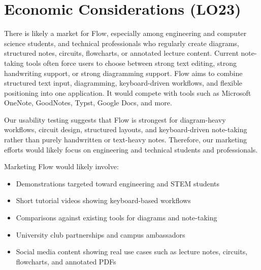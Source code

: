 \documentclass{article}
\begin{document}
\section{Economic Considerations (LO23)}


There is likely a market for Flow, especially among engineering  and computer 
science students, and technical professionals who regularly create diagrams, 
structured notes, circuits, flowcharts, or annotated lecture content. Current 
note-taking tools often force users to choose between strong text editing, 
strong handwriting support, or strong diagramming support. Flow aims to combine 
structured text input, diagramming, keyboard-driven workflows, and flexible 
positioning into one application. It would compete with tools such as Microsoft 
OneNote, GoodNotes, Typst, Google Docs, and more. 

Our usability testing suggests that Flow is strongest for diagram-heavy 
workflows, circuit design, structured layouts, and keyboard-driven note-taking 
rather than purely handwritten or text-heavy notes. Therefore, our marketing efforts
would likely focus on engineering and technical students and professionals.

\vspace{0.5em}

Marketing Flow would likely involve:
\begin{itemize}
\item Demonstrations targeted toward engineering and STEM students
\item Short tutorial videos showing keyboard-based workflows
\item Comparisons against existing tools for diagrams and note-taking
\item University club partnerships and campus ambassadors
\item Social media content showing real use cases such as lecture notes, circuits,
 flowcharts, and annotated PDFs
\end{itemize}

\vspace{0.5em}
\end{document}
